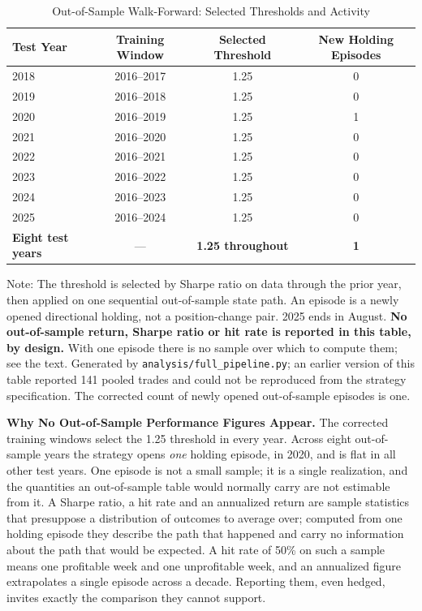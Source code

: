 \documentclass[11pt]{article}
\begin{document}
\begin{table}[H]
\centering
\caption{Out-of-Sample Walk-Forward: Selected Thresholds and Activity}
\label{tab:oos}
\small
\begin{tabular}{@{}lccc@{}}
\toprule
Test Year & Training Window & Selected Threshold & New Holding Episodes \\
\midrule
2018 & 2016--2017 & 1.25 & 0 \\
2019 & 2016--2018 & 1.25 & 0 \\
2020 & 2016--2019 & 1.25 & 1 \\
2021 & 2016--2020 & 1.25 & 0 \\
2022 & 2016--2021 & 1.25 & 0 \\
2023 & 2016--2022 & 1.25 & 0 \\
2024 & 2016--2023 & 1.25 & 0 \\
2025 & 2016--2024 & 1.25 & 0 \\
\midrule
\textbf{Eight test years} & --- & \textbf{1.25 throughout} & \textbf{1} \\
\bottomrule
\end{tabular}
\par\vspace{0.3em}
\parbox{\linewidth}{\footnotesize Note: The threshold is selected by Sharpe ratio on data through the prior year, then applied on one sequential out-of-sample state path. An episode is a newly opened directional holding, not a position-change pair. 2025 ends in August. \textbf{No out-of-sample return, Sharpe ratio or hit rate is reported in this table, by design.} With one episode there is no sample over which to compute them; see the text. Generated by \texttt{analysis/full\_pipeline.py}; an earlier version of this table reported 141 pooled trades and could not be reproduced from the strategy specification. The corrected count of newly opened out-of-sample episodes is one.}
\end{table}

\textbf{Why No Out-of-Sample Performance Figures Appear.} The corrected training windows select the 1.25 threshold in every year. Across eight out-of-sample years the strategy opens \emph{one} holding episode, in 2020, and is flat in all other test years. One episode is not a small sample; it is a single realization, and the quantities an out-of-sample table would normally carry are not estimable from it. A Sharpe ratio, a hit rate and an annualized return are sample statistics that presuppose a distribution of outcomes to average over; computed from one holding episode they describe the path that happened and carry no information about the path that would be expected. A hit rate of 50\% on such a sample means one profitable week and one unprofitable week, and an annualized figure extrapolates a single episode across a decade. Reporting them, even hedged, invites exactly the comparison they cannot support.
\end{document}
